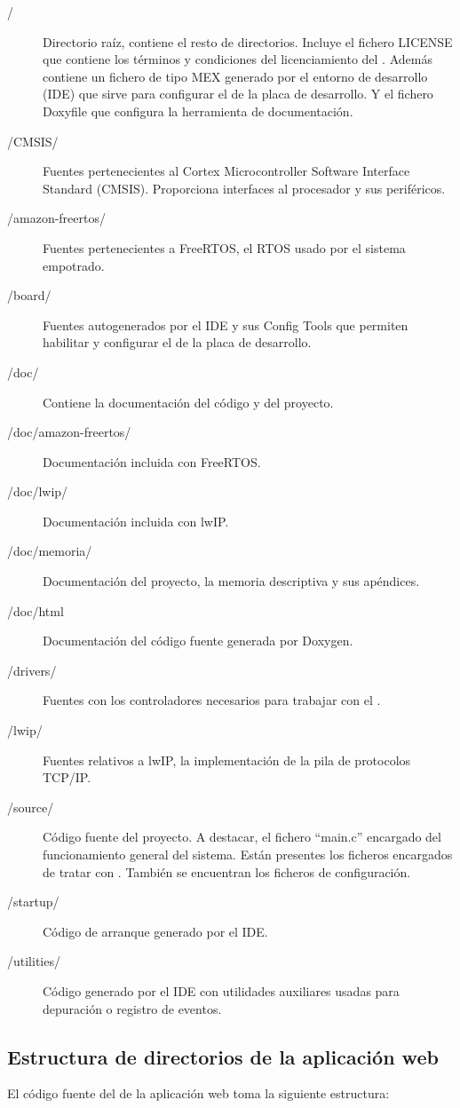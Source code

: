 \begin{description}
  \item[/] Directorio raíz, contiene el resto de directorios. Incluye el
  fichero LICENSE que contiene los términos y condiciones del licenciamiento
  del \sw{}. Además contiene un fichero de tipo MEX generado por el entorno
  de desarrollo (IDE) que sirve para configurar el \hw{} de la placa de
  desarrollo. Y el fichero Doxyfile que configura la herramienta de documentación.
  \item[/CMSIS/] Fuentes pertenecientes al Cortex Microcontroller Software
  Interface Standard (CMSIS). Proporciona interfaces al procesador y sus
  periféricos.
  \item[/amazon-freertos/] Fuentes pertenecientes a FreeRTOS, el RTOS usado por
  el sistema empotrado.
  \item[/board/] Fuentes autogenerados por el IDE y sus Config Tools que 
  permiten habilitar y configurar el \hw{} de la placa de desarrollo.
  \item[/doc/] Contiene la documentación del código y del proyecto.
  \item[/doc/amazon-freertos/] Documentación incluida con FreeRTOS.
  \item[/doc/lwip/] Documentación incluida con lwIP.
  \item[/doc/memoria/] Documentación del proyecto, la memoria descriptiva y
  sus apéndices.
  \item[/doc/html] Documentación del código fuente generada por Doxygen.
  \item[/drivers/] Fuentes con los controladores necesarios para trabajar con el
  \hw{}.
  \item[/lwip/] Fuentes relativos a lwIP, la implementación de la pila de 
  protocolos TCP/IP.
  \item[/source/] Código fuente del proyecto. A destacar, el fichero ``main.c''
  encargado del funcionamiento general del sistema. Están presentes los ficheros
  encargados de tratar con \hw{}. También se encuentran los ficheros de
  configuración.
  \item[/startup/] Código de arranque generado por el IDE.
  \item[/utilities/] Código generado por el IDE con utilidades auxiliares usadas
  para depuración o registro de eventos.
\end{description}


\subsection{Estructura de directorios de la aplicación web}
\label{sec:man-dev-struct-aw}
El código fuente del \sw{} de la aplicación web toma la siguiente estructura:

